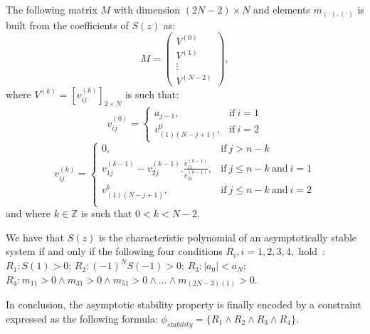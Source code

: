 
The following matrix $M$ with dimension $(2N-2)\times N$ and elements $m_{(\cdot),(\cdot)}$ is built from the coefficients of $S(z)$ as:  
%
$$
M=\left( 
\begin{array}{c}
V^{(0)}\\
V^{(1)}\\
\vdots\\
V^{(N-2)}
\end{array}
\right), 
$$
%
where $V^{(k)} = [v^{(k)}_{ij} ]_{2\times N}$ is such that:
%
$$
v_{ij}^{(0)}=\left\{
\begin{array}{ll}
a_{j-1}, & \mbox{if}~i=1\\
v_{(1)(N-j+1)}^{0},&\mbox{if}~i=2
\end{array}
\right.
$$
%
$$
v_{ij}^{(k)}=\left\{
\begin{array}{ll}
0,&\mbox{if}~j>n-k\\
v_{1j}^{(k-1)}-v_{2j}^{(k-1)} . \frac{v_{11}^{(k-1)}}{v_{21}^{(k-1)}}, & \mbox{if}~j\leq n-k ~\mbox{and}~i=1\\
v_{(1)(N-j+1)}^{k},& \mbox{if}~j\leq n-k ~\mbox{and}~i=2\\
\end{array}
\right.
$$
%
and where $k \in \mathbb{Z}$ is such that $0 < k < N - 2$.  

We have that $S(z)$ is the characteristic polynomial of an asymptotically stable system if and only if the following four conditions $R_i, i = 1,2,3,4,$ hold~\cite{astrom1997computer}: 
$R_1: S(1) > 0$;
$R_2: (-1)^N S(-1) > 0$;
$R_3: |a_0| < a_N$;
$R_4: m_{11} > 0 \wedge\allowbreak
      m_{31}>0 \wedge\allowbreak
      m_{51}>0 \wedge \ldots \wedge\allowbreak
      m_{(2N{-}3)(1)}>0$.

In conclusion, 
the asymptotic stability property is finally encoded by a constraint expressed as the following formula: 
$
\phi_\mathit{stability} = \{R_1 \wedge R_2 \wedge R_3 \wedge R_4\}.
$

